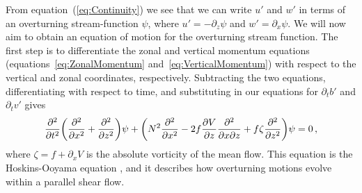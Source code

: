     From equation~(\ref{eq:Continuity}) we see that we can write $u'$ and $w'$ in terms of an overturning stream-function $\psi$, where $u' = - \partial_z \psi$ and $w' = \partial_x \psi$. We will now aim to obtain an equation of motion for the overturning stream function. The first step is to differentiate the zonal and vertical momentum equations (equations~\ref{eq:ZonalMomentum} and~\ref{eq:VerticalMomentum}) with respect to the vertical and zonal coordinates, respectively. Subtracting the two equations, differentiating with respect to time, and substituting in our equations for $\partial_t b'$ and $\partial_t v'$ gives
    \begin{equation}
    \label{eq:OriginalHoskins}
    \pdv[2]{}{t} \bigg(\pdv[2]{}{x} + \pdv[2]{}{z}\bigg) \psi + \bigg( N^2 \pdv[2]{}{x} - 2 f \pdv{V}{z} \pdv[2]{}{x}{z} + f \zeta \pdv[2]{}{z} \bigg) \psi = 0 \, ,
    \end{equation}
    where $\zeta = f + \partial_x V$ is the absolute vorticity of the mean flow. This equation is the Hoskins-Ooyama equation \citep{Hoskins1974, Ooyama1966}, and it describes how overturning motions evolve within a parallel shear flow.
    
